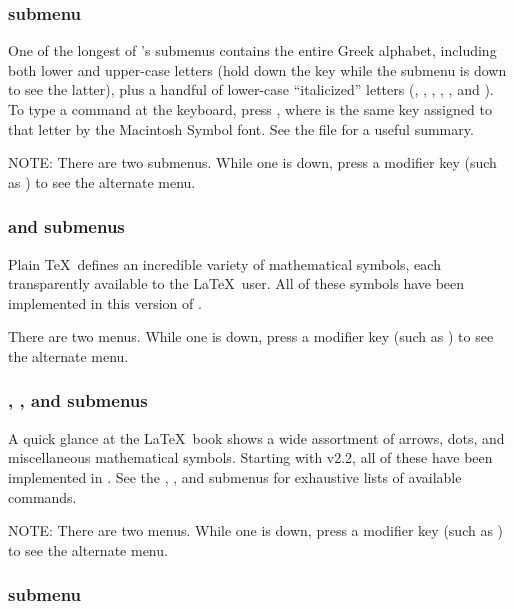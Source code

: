 \documentclass{report}
\begin{document}
\subsubsection{ submenu}

One of the longest of 's submenus contains the 
entire Greek alphabet, including both lower and upper-case letters 
(hold down the  key while the  submenu is down 
to see the latter), plus a handful of lower-case ``italicized'' 
letters (, , , , 
, and ).  To type a  command at 
the keyboard, press  , where  is 
the same key assigned to that letter by the Macintosh Symbol font.  See 
the file  for a useful summary.

NOTE: There are two  submenus.  While one is down, press 
a modifier key (such as ) to see the alternate menu.

\subsubsection{ and  submenus}

Plain \TeX\ defines an incredible variety of mathematical symbols, 
each transparently available to the \LaTeX\ user.  All of these 
symbols have been implemented in this version of .

There are two  menus.  While one is down, press 
a modifier key (such as ) to see the alternate menu.

\subsubsection{, , and  submenus}

A quick glance at the \LaTeX\ book shows a wide assortment of arrows, 
dots, and miscellaneous mathematical symbols.  Starting with v2.2, all 
of these have been implemented in .  See the 
, , and  submenus for 
exhaustive lists of available commands.

NOTE: There are two  menus.  While one is down, press a 
modifier key (such as ) to see the alternate menu.

\subsubsection{ submenu}
\end{document}
